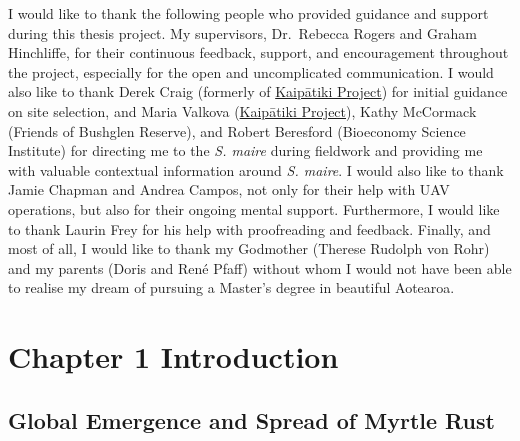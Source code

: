 \documentclass[
]{scrreprt}
\begin{document}
I would like to thank the following people who provided guidance and
support during this thesis project. My supervisors, Dr.~Rebecca Rogers
and Graham Hinchliffe, for their continuous feedback, support, and
encouragement throughout the project, especially for the open and
uncomplicated communication. I would also like to thank Derek Craig
(formerly of \href{https://kaipatiki.org.nz}{Kaipātiki Project}) for
initial guidance on site selection, and Maria Valkova
(\href{https://kaipatiki.org.nz}{Kaipātiki Project}), Kathy McCormack
(Friends of Bushglen Reserve), and Robert Beresford (Bioeconomy Science
Institute) for directing me to the \emph{S. maire} during fieldwork and
providing me with valuable contextual information around \emph{S.
maire}. I would also like to thank Jamie Chapman and Andrea Campos, not
only for their help with UAV operations, but also for their ongoing
mental support. Furthermore, I would like to thank Laurin Frey for his
help with proofreading and feedback. Finally, and most of all, I would
like to thank my Godmother (Therese Rudolph von Rohr) and my parents
(Doris and René Pfaff) without whom I would not have been able to
realise my dream of pursuing a Master's degree in beautiful Aotearoa.

\newpage

\listoffigures

\newpage

\listoftables

\newpage

\tableofcontents

\newpage

\chapter{Chapter 1 Introduction}\label{sec-introduction}

\section{Global Emergence and Spread of Myrtle
Rust}\label{global-emergence-and-spread-of-myrtle-rust}
\end{document}
